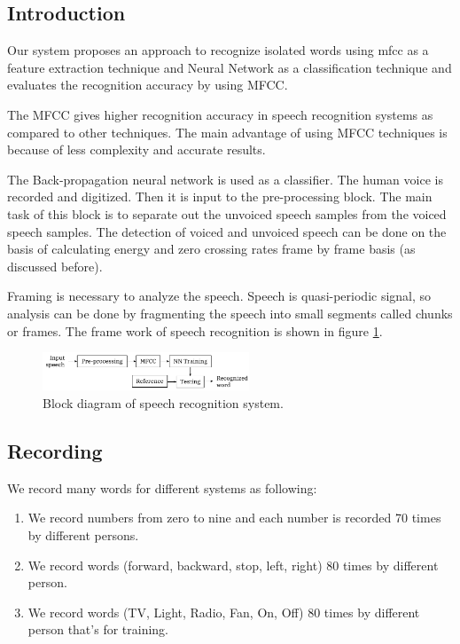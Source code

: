 \documentclass[12pt, a4paper, twoside]{report}
\begin{document}
\subsection{Introduction}
Our system proposes an approach to recognize isolated words using \acrshort{mfcc} as a feature extraction technique and Neural Network as a classification technique and evaluates the recognition accuracy by using MFCC.
\par
The MFCC gives higher recognition accuracy in speech recognition systems as compared to other techniques. The main advantage of using MFCC techniques is because of less complexity and accurate results.
\par
The Back-propagation neural network is used as a classifier. The human voice is recorded and digitized. Then it is input to the pre-processing block. The main task of this block is to separate out the unvoiced speech samples from the voiced speech samples. The detection of voiced and unvoiced speech can be done on the basis of calculating energy and zero crossing rates frame by frame basis (as discussed before). 
\par
Framing is necessary to analyze the speech. Speech is quasi-periodic signal, so analysis can be done by fragmenting the speech into small segments called chunks or frames. The frame work of speech recognition is shown in figure \ref{fig:nn-framework}.
\begin{figure}[!h]
	\centering
	\includegraphics[width=0.55\textwidth]
	{images/chapter5/nn-framework}
	\caption{Block diagram of speech recognition system.}
	\label{fig:nn-framework}
\end{figure}

\subsection{Recording}
We record many words for different systems as following:
\begin{enumerate}
\item We record numbers from zero to nine and each number is recorded 70 times by different persons. 
\item We record words (forward, backward, stop, left, right) 80 times by different person.
\item We record words (TV, Light, Radio, Fan, On, Off) 80 times by different person that's for training.
\end{enumerate}
\end{document}
